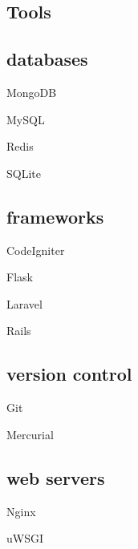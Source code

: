 \documentclass{article}
\newenvironment{aside}{
\begin{minipage}[t]{0.25\textwidth}
\begin{flushright}
}{
\end{flushright}
\end{minipage}
}
\begin{document}
\begin{aside}
\section*{Tools}
\subsection*{\small databases}
\begin{itemize*}
\item{MongoDB}
\item{MySQL}
\item{Redis}
\item{SQLite}
\end{itemize*}

\subsection*{\small frameworks}
\begin{itemize*}
\item{CodeIgniter}
\item{Flask}
\item{Laravel}
\item{Rails}
\end{itemize*}

\subsection*{\small version control}
\begin{itemize*}
\item{Git}
\item{Mercurial}
\end{itemize*}

\subsection*{\small web servers}
\begin{itemize*}
\item{Nginx}
\item{uWSGI}
\end{itemize*}


\end{aside}
\hspace{1em} \vrule \hspace{1em}
\end{document}
